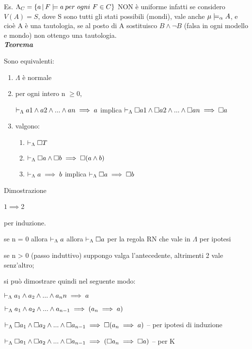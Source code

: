 Es. $\Lambda_{C}=\{a\,|\,\vera F{a\: per}\ ogni\ F\in C\}$ NON è
uniforme infatti se considero $V(A)=S$, dove S sono tutti gli stati
possibili (mondi), vale anche $\mu\models_{\alpha}A$, e cioè A è
una tautologia, se al posto di A sostituisco $B\wedge\neg B$ (falsa
in ogni modello e mondo) non ottengo una tautologia.\\
 

\textbf{\emph{\large{{{{{{Teorema}}}}}}}}{\large \par}

Sono equivalenti: 
\begin{enumerate}
\item $\Lambda$ è normale 
\item per ogni intero n $\geq0$,


$\vdash_{\Lambda}a1\wedge a2\wedge...\wedge an\implies a$ implica $\vdash_{\Lambda}\square a1\wedge\square a2\wedge...\wedge\square a n\implies\square a$

\item valgono:

\begin{enumerate}
\item $\vdash_{\Lambda}\square T$ 
\item $\vdash_{\Lambda}\square a\wedge\square b\implies\square(a\wedge b)$ 
\item $\vdash_{\Lambda}a\implies b$ implica $\vdash_{\Lambda}\square a\implies\square b$ 
\end{enumerate}
\end{enumerate}
Dimostrazione

$1\implies$2

per induzione.

se n = 0 allora $\vdash_{\Lambda}a$ allora $\vdash_{\Lambda}\square a$ per la regola
RN che vale in $\Lambda$ per ipotesi

se n > 0 (passo induttivo) suppongo valga l'antecedente, altrimenti
2 vale senz'altro;

si può dimostrare quindi nel seguente modo:

$\vdash_{\Lambda}a_{1}\wedge a_{2}\wedge...\wedge a_{n}n\implies a$

$\vdash_{\Lambda}a_{1}\wedge a_{2}\wedge...\wedge a_{n-1}\implies(a_{n}\implies a)$ 

$\vdash_{\Lambda}\square a_{1}\wedge\square a_{2}\wedge...\wedge\square a_{n-1}\implies\square(a_{n}\implies a)$
-- per ipotesi di induzione

$\vdash_{\Lambda}\square a_{1}\wedge\square a_{2}\wedge...\wedge\square a_{n-1}\implies(\square a_{n}\implies\square a)$
-- per K

